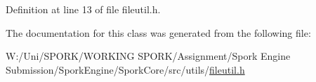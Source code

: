 Definition at line 13 of file fileutil.\+h.



The documentation for this class was generated from the following file\+:\begin{DoxyCompactItemize}
\item 
W\+:/\+Uni/\+S\+P\+O\+R\+K/\+W\+O\+R\+K\+I\+N\+G S\+P\+O\+R\+K/\+Assignment/\+Spork Engine Submission/\+Spork\+Engine/\+Spork\+Core/src/utils/\hyperlink{fileutil_8h}{fileutil.\+h}\end{DoxyCompactItemize}
